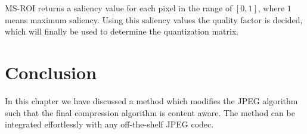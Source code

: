 MS-ROI returns a saliency value for each pixel in the range of $[0, 1]$, where $1$ means maximum saliency. Using this saliency values the quality factor is decided, which will finally be used to determine the quantization matrix.


\section{Conclusion}
In this chapter we have discussed a method which modifies the JPEG algorithm such that the final compression algorithm is content aware. The method can be integrated effortlessly with any off-the-shelf JPEG codec. 
